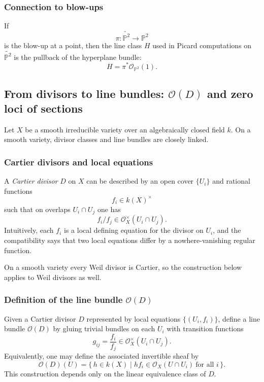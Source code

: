 \documentclass[12pt,a4paper]{article}
\theoremstyle{plain}
\theoremstyle{definition}      %
\begin{document}
\subsubsection*{Connection to blow-ups}

If
\[
\pi:\widetilde{\mathbb P^2}\to \mathbb P^2
\]
is the blow-up at a point, then the line class $H$ used in Picard computations on $\widetilde{\mathbb P^2}$ is the pullback of the hyperplane bundle:
\[
H=\pi^{*}\mathcal O_{\mathbb P^2}(1).
\]


\subsection*{From divisors to line bundles: $\mathcal O(D)$ and zero loci of sections}

Let $X$ be a smooth irreducible variety over an algebraically closed field $k$.
On a smooth variety, divisor classes and line bundles are closely linked.

\subsubsection*{Cartier divisors and local equations}

A \emph{Cartier divisor} $D$ on $X$ can be described by an open cover $\{U_i\}$ and rational functions
\[
f_i\in k(X)^\times
\]
such that on overlaps $U_i\cap U_j$ one has
\[
f_i/f_j\in \mathcal O_X^\times(U_i\cap U_j).
\]
Intuitively, each $f_i$ is a local defining equation for the divisor on $U_i$, and the compatibility says that two local equations differ by a nowhere-vanishing regular function.

On a smooth variety every Weil divisor is Cartier, so the construction below applies to Weil divisors as well.

\subsubsection*{Definition of the line bundle $\mathcal O(D)$}

Given a Cartier divisor $D$ represented by local equations $\{(U_i,f_i)\}$, define a line bundle $\mathcal O(D)$ by gluing trivial bundles on each $U_i$ with transition functions
\[
g_{ij}=\frac{f_i}{f_j}\in \mathcal O_X^\times(U_i\cap U_j).
\]
Equivalently, one may define the associated invertible sheaf by
\[
\mathcal O(D)(U)=\{\,h\in k(X)\mid h f_i \in \mathcal O_X(U\cap U_i)\ \text{for all } i\,\}.
\]
This construction depends only on the linear equivalence class of $D$.
\end{document}
